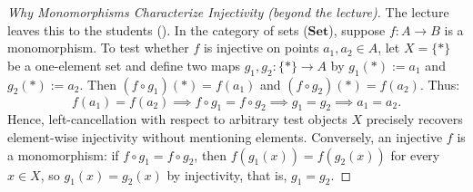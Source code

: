 \begin{content}[Monomorphisms]

{\centering
{}\par}

\begin{proof}[Why Monomorphisms Characterize Injectivity (beyond the lecture)]
The lecture leaves this to the students (). In the category of sets ($\mathbf{Set}$), suppose $f \colon A \to B$ is a monomorphism. To test whether $f$ is injective on points $a_1, a_2 \in A$, let $X = \{*\}$ be a one-element set and define two maps $g_1, g_2 \colon \{*\} \to A$ by $g_1(*) := a_1$ and $g_2(*) := a_2$.
Then $(f \circ g_1)(*) = f(a_1)$ and $(f \circ g_2)(*) = f(a_2)$. Thus:
\[
f(a_1) = f(a_2) \implies f \circ g_1 = f \circ g_2 \implies g_1 = g_2 \implies a_1 = a_2.
\]
Hence, left-cancellation with respect to arbitrary test objects $X$ precisely recovers element-wise injectivity without mentioning elements. Conversely, an injective $f$ is a monomorphism: if $f \circ g_1 = f \circ g_2$, then $f(g_1(x)) = f(g_2(x))$ for every $x \in X$, so $g_1(x) = g_2(x)$ by injectivity, that is, $g_1 = g_2$.
\end{proof}
\end{content}

